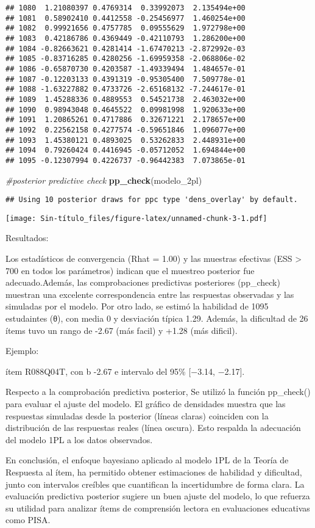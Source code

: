 \documentclass[
]{article}
\newenvironment{Shaded}{\begin{snugshade}}{\end{snugshade}}
\newcommand{\CommentTok}[1]{\textcolor[rgb]{0.56,0.35,0.01}{\textit{#1}}}
\newcommand{\FunctionTok}[1]{\textcolor[rgb]{0.13,0.29,0.53}{\textbf{#1}}}
\newcommand{\NormalTok}[1]{#1}
\begin{document}
\begin{verbatim}
## 1080  1.21080397 0.4769314  0.33992073  2.135494e+00
## 1081  0.58902410 0.4412558 -0.25456977  1.460254e+00
## 1082  0.99921656 0.4757785  0.09555629  1.972798e+00
## 1083  0.42186786 0.4369449 -0.42110793  1.286200e+00
## 1084 -0.82663621 0.4281414 -1.67470213 -2.872992e-03
## 1085 -0.83716285 0.4280256 -1.69959358 -2.068806e-02
## 1086 -0.65870730 0.4203587 -1.49339494  1.484657e-01
## 1087 -0.12203133 0.4391319 -0.95305400  7.509778e-01
## 1088 -1.63227882 0.4733726 -2.65168132 -7.244617e-01
## 1089  1.45288336 0.4889553  0.54521738  2.463032e+00
## 1090  0.98943048 0.4645522  0.09981998  1.920633e+00
## 1091  1.20865261 0.4717886  0.32671221  2.178657e+00
## 1092  0.22562158 0.4277574 -0.59651846  1.096077e+00
## 1093  1.45380121 0.4893025  0.53262833  2.448931e+00
## 1094  0.79260424 0.4416945 -0.05712052  1.694844e+00
## 1095 -0.12307994 0.4226737 -0.96442383  7.073865e-01
\end{verbatim}

\begin{Shaded}
\begin{Highlighting}[]
\CommentTok{\#posterior predictive check}
\FunctionTok{pp\_check}\NormalTok{(modelo\_2pl)}
\end{Highlighting}
\end{Shaded}

\begin{verbatim}
## Using 10 posterior draws for ppc type 'dens_overlay' by default.
\end{verbatim}

\texttt{[image: Sin-título\_files/figure-latex/unnamed-chunk-3-1.pdf]}

Resultados:

Los estadísticos de convergencia (Rhat = 1.00) y las muestras efectivas
(ESS \textgreater{} 700 en todos los parámetros) indican que el muestreo
posterior fue adecuado.Además, las comprobaciones predictivas
posteriores (pp\_check) muestran una excelente correspondencia entre las
respuestas observadas y las simuladas por el modelo. Por otro lado, se
estimó la habilidad de 1095 estudaintes (θ), con media 0 y desviación
típica 1.29. Además, la dificultad de 26 ítems tuvo un rango de -2.67
(más facil) y +1.28 (más dificil).

Ejemplo:

ítem R088Q04T, con b -2.67 e intervalo del 95\% {[}−3.14, −2.17{]}.

Respecto a la comprobación predictiva posterior, Se utilizó la función
pp\_check() para evaluar el ajuste del modelo. El gráfico de densidades
muestra que las respuestas simuladas desde la posterior (líneas claras)
coinciden con la distribución de las respuestas reales (línea oscura).
Esto respalda la adecuación del modelo 1PL a los datos observados.

En conclusión, el enfoque bayesiano aplicado al modelo 1PL de la Teoría
de Respuesta al ítem, ha permitido obtener estimaciones de habilidad y
dificultad, junto con intervalos creíbles que cuantifican la
incertidumbre de forma clara. La evaluación predictiva posterior sugiere
un buen ajuste del modelo, lo que refuerza su utilidad para analizar
ítems de comprensión lectora en evaluaciones educativas como PISA.
\end{document}

